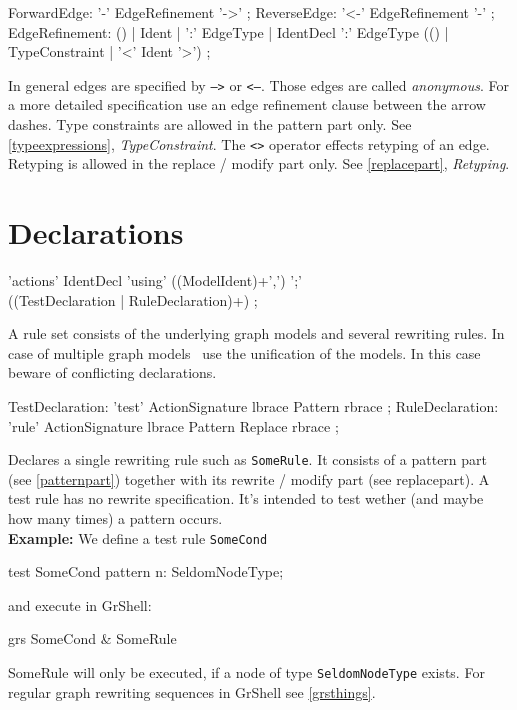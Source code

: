 \begin{rail}
  ForwardEdge: '-' EdgeRefinement '->' ;
  ReverseEdge: '<-' EdgeRefinement '-' ;  
  EdgeRefinement: () | Ident | ':' EdgeType | IdentDecl ':' EdgeType (() | TypeConstraint | '<' Ident '>') ;
\end{rail}
In general edges are specified by \texttt{-->} or \texttt{<--}. Those edges are called \emph{anonymous}. For a more detailed specification use an edge refinement clause between the arrow dashes. Type constraints are allowed in the pattern part only. See \ref{typeexpressions}, \emph{TypeConstraint}. The \texttt{<>} operator effects retyping of an edge. Retyping is allowed in the replace / modify part only. See \ref{replacepart}, \emph{Retyping}.

\section{Declarations}
\label{ruledecls}
\begin{rail}
  'actions' IdentDecl 'using' ((ModelIdent)+',') ';' \\ ((TestDeclaration | RuleDeclaration)+) ;
\end{rail}
A rule set consists of the underlying graph models and several rewriting rules. In case of multiple graph models \GrG\ use the unification of the models. In this case beware of conflicting declarations.

\begin{rail}
  TestDeclaration: 'test' ActionSignature lbrace Pattern rbrace ;
  RuleDeclaration: 'rule' ActionSignature lbrace Pattern Replace rbrace ;
\end{rail}
Declares a single rewriting rule such as \texttt{SomeRule}. It consists of a pattern part (see \ref{patternpart}) together with its rewrite / modify part (see {replacepart}). A test rule has no rewrite specification. It's intended to test wether (and maybe how many times) a pattern occurs.\\
{\small \textbf{Example:} We define a test rule \texttt{SomeCond}}
\begin{grgen}
test SomeCond {
  pattern {
    n: SeldomNodeType;
  }
}
\end{grgen}
{\small and execute in GrShell:}
\begin{grshell}
  grs SomeCond & SomeRule
\end{grshell}
{\small SomeRule will only be executed, if a node of type \texttt{SeldomNodeType} exists. For regular graph rewriting sequences in GrShell see \ref{grsthings}.}

